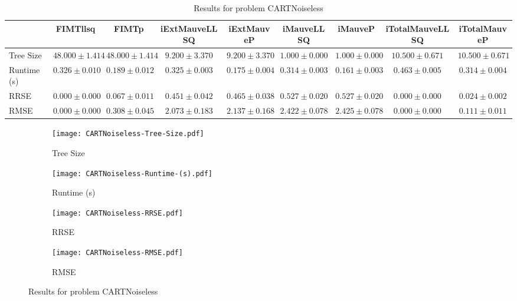 \documentclass{article}
\begin{document}
\begin{table}[h]
\tiny
\begin{tabular}{|l|c|c|c|c|c|c|c|c|}
\hline
 & FIMTllsq & FIMTp & iExtMauveLLSQ & iExtMauveP & iMauveLLSQ & iMauveP & iTotalMauveLLSQ & iTotalMauveP\\
\hline
Tree Size & $48.000 \pm 1.414$ & $48.000 \pm 1.414$ & $9.200 \pm 3.370$ & $9.200 \pm 3.370$ & \cellcolor{blue!25} $1.000 \pm 0.000$ & \cellcolor{blue!25} $1.000 \pm 0.000$ & $10.500 \pm 0.671$ & $10.500 \pm 0.671$ \\
\hline
Runtime (s) & $0.326 \pm 0.010$ & $0.189 \pm 0.012$ & $0.325 \pm 0.003$ & $0.175 \pm 0.004$ & $0.314 \pm 0.003$ & \cellcolor{blue!25} $0.161 \pm 0.003$ & $0.463 \pm 0.005$ & $0.314 \pm 0.004$ \\
\hline
RRSE & \cellcolor{blue!25} $0.000 \pm 0.000$ & $0.067 \pm 0.011$ & $0.451 \pm 0.042$ & $0.465 \pm 0.038$ & $0.527 \pm 0.020$ & $0.527 \pm 0.020$ & $0.000 \pm 0.000$ & $0.024 \pm 0.002$ \\
\hline
RMSE & \cellcolor{blue!25} $0.000 \pm 0.000$ & $0.308 \pm 0.045$ & $2.073 \pm 0.183$ & $2.137 \pm 0.168$ & $2.422 \pm 0.078$ & $2.425 \pm 0.078$ & $0.000 \pm 0.000$ & $0.111 \pm 0.011$ \\
\hline
\end{tabular}
\caption{Results for problem CARTNoiseless}
\end{table}
\begin{figure}[h]
\centering
\begin{subfigure}{0.45\textwidth}
  \texttt{[image: CARTNoiseless-Tree-Size.pdf]}
  \caption{Tree Size}
\end{subfigure}
\begin{subfigure}{0.45\textwidth}
  \texttt{[image: CARTNoiseless-Runtime-(s).pdf]}
  \caption{Runtime (s)}
\end{subfigure}
\begin{subfigure}{0.45\textwidth}
  \texttt{[image: CARTNoiseless-RRSE.pdf]}
  \caption{RRSE}
\end{subfigure}
\begin{subfigure}{0.45\textwidth}
  \texttt{[image: CARTNoiseless-RMSE.pdf]}
  \caption{RMSE}
\end{subfigure}
\caption{Results for problem CARTNoiseless}
\end{figure}
\end{document}
